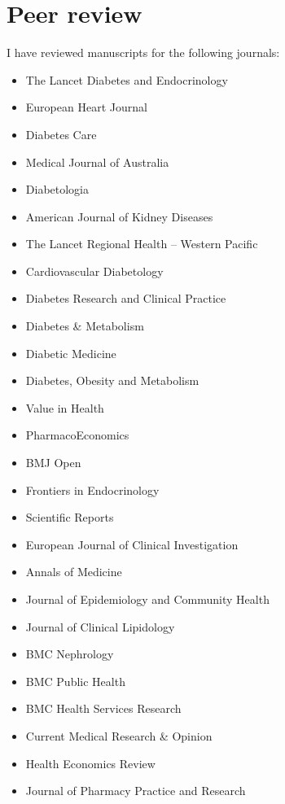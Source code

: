 \documentclass[11pt]{article}
\begin{document}
\section*{Peer review}
I have reviewed manuscripts for the following journals:
\begin{itemize}
\item The Lancet Diabetes and Endocrinology 
\item European Heart Journal 
\item Diabetes Care 
\item Medical Journal of Australia 
\item Diabetologia 
\item American Journal of Kidney Diseases 
\item The Lancet Regional Health – Western Pacific 
\item Cardiovascular Diabetology 
\item Diabetes Research and Clinical Practice 
\item Diabetes \& Metabolism 
\item Diabetic Medicine 
\item Diabetes, Obesity and Metabolism 
\item Value in Health 
\item PharmacoEconomics 
\item BMJ Open 
\item Frontiers in Endocrinology 
\item Scientific Reports 
\item European Journal of Clinical Investigation 
\item Annals of Medicine 
\item Journal of Epidemiology and Community Health 
\item Journal of Clinical Lipidology 
\item BMC Nephrology 
\item BMC Public Health 
\item BMC Health Services Research 
\item Current Medical Research  \& Opinion 
\item Health Economics Review 
\item Journal of Pharmacy Practice and Research 
\end{itemize}
\end{document}
